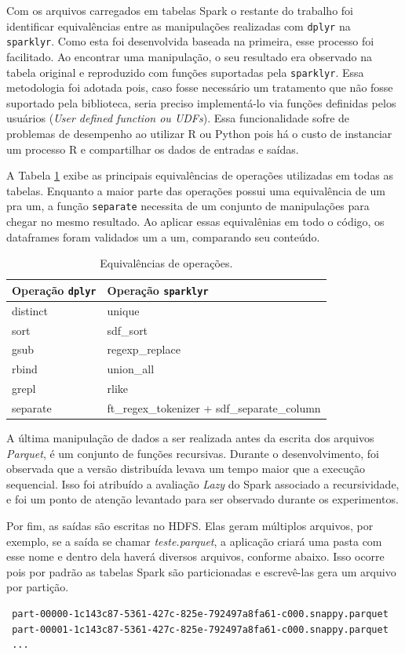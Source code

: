 Com os arquivos carregados em tabelas Spark o restante do trabalho 
foi identificar equivalências entre as manipulações realizadas com \texttt{dplyr}
na \texttt{sparklyr}. Como esta foi desenvolvida baseada na primeira, esse 
processo foi facilitado. Ao encontrar uma manipulação, o seu resultado era 
observado na tabela original e reproduzido com funções suportadas pela 
\texttt{sparklyr}. Essa metodologia foi adotada pois, caso fosse necessário um 
tratamento que não fosse suportado pela biblioteca, seria preciso implementá-lo 
via funções definidas pelos usuários (\emph{User defined function ou UDFs}). 
Essa funcionalidade sofre de problemas de desempenho ao utilizar R ou Python 
pois há o custo de instanciar um processo R e compartilhar os dados de entradas 
e saídas. 

A Tabela \ref{tab:equivalence} exibe as principais equivalências de operações 
utilizadas em todas as tabelas. Enquanto a maior parte das operações possui uma 
equivalência de um pra um, a função \texttt{separate} necessita de um conjunto 
de manipulações para chegar no mesmo resultado. Ao aplicar essas equivalênias em 
todo o código, os dataframes foram validados um a um, comparando seu conteúdo. 

\begin{table}[H]
\centering
\begin{tabular}{l l} \toprule
\textbf{Operação \texttt{dplyr}}  &  \textbf{Operação \texttt{sparklyr}}\\ 
\midrule
distinct	& unique  \\
sort		& sdf\_sort \\
gsub		& regexp\_replace\\
rbind		& union\_all\\
grepl		& rlike\\
separate	& ft\_regex\_tokenizer + sdf\_separate\_column       \\
\end{tabular}
\caption{Equivalências de operações.}
\label{tab:equivalence}
\end{table}

A última manipulação de dados a ser realizada antes da escrita dos arquivos 
\textit{Parquet}, é um conjunto de funções recursivas. Durante o 
desenvolvimento, foi observada que a versão distribuída levava 
um tempo maior que a execução sequencial. Isso foi atribuído a avaliação 
\emph{Lazy} do Spark associado a recursividade, e foi um ponto de atenção 
levantado para ser observado durante os experimentos.

Por fim, as saídas são escritas no HDFS. Elas geram múltiplos arquivos, por 
exemplo, se a saída se chamar \emph{teste.parquet}, a aplicação criará uma pasta 
com esse nome e dentro dela haverá diversos arquivos, conforme abaixo. Isso 
ocorre pois por padrão as tabelas Spark são particionadas e escrevê-las gera um 
arquivo por partição.

\footnotesize
\begin{lstlisting}
 part-00000-1c143c87-5361-427c-825e-792497a8fa61-c000.snappy.parquet
 part-00001-1c143c87-5361-427c-825e-792497a8fa61-c000.snappy.parquet
 ...
\end{lstlisting}






